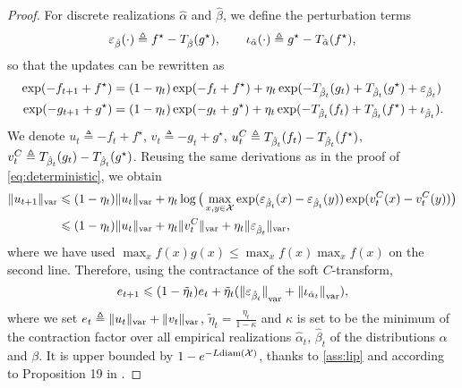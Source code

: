 \begin{proof}
For discrete realizations $\hat \alpha$ and $\hat \beta$, we define the perturbation terms
\begin{equation}
    \epsilon_{\hat \beta}(\cdot) \triangleq
    f^\star - \Ctrans{g^\star}{\hat \beta} ,\qquad
    \iota_{\hat \alpha}(\cdot) \triangleq 
    g^\star - \Ctrans{f^\star}{\hat \alpha},
\end{equation}
so that the updates can be rewritten as
\begin{align}
    \exp(-f_{t+1} + f^\star) &= (1 - \eta_t)
    \exp(-f_{t} + f^\star)
    + \eta_t \exp(-\Ctrans{g_t}{\hat \beta_t} 
    +\Ctrans{g^\star}{\hat \beta_t} + \epsilon_{\hat \beta_t}) \\
    \exp(-g_{t+1} + g^\star) &= (1 - \eta_t)
    \exp(-g_{t} + g^\star)
    + \eta_t \exp(-\Ctrans{f_t}{\hat \beta_t} 
    +\Ctrans{f^\star}{\hat \beta_t} + \iota_{\hat \beta_t}).
\end{align}
We denote $u_t \triangleq -f_{t} + f^\star$, $v_t \triangleq -g_{t} + g^\star$, $u_t^C \triangleq
\Ctrans{f_t}{\hat \beta_t} - \Ctrans{f^\star}{\hat \beta_t}$, $v_t^C \triangleq
\Ctrans{g_t}{\hat \beta_t} - \Ctrans{g^\star}{\hat \beta_t}$. Reusing the same
derivations as in the proof of \autoref{eq:deterministic}, we obtain
    \label{eq:pre_ineq_var}
    \begin{align}
    \Vert u_{t+1} \Vert_{\var} &\leq
    (1 - \eta_t) \Vert u_t \Vert_{\var}
    + \eta_t \log \big( \max_{x, y \in \Xx}
    \exp(\epsilon_{\hat \beta_t}(x) 
    - \epsilon_{\hat \beta_t}(y)) \exp(v_t^C(x) - v_t^C(y)) \big) \\ 
    &\leq
    (1 - \eta_t) \Vert u_t \Vert_{\var}
    + \eta_t \Vert v_t^C \Vert_{\var}
    + \eta_t \Vert \epsilon_{\hat \beta_t} \Vert_{\var},
\end{align}
where we have used $\max_x f(x) g(x) \leq \max_x f(x) \max_x f(x)$ on the second line. Therefore,
using the contractance of the soft $C$-transform,
\begin{equation}
    \label{eq:ineq_var}
    e_{t+1} \leq 
    (1 - \tilde \eta_t) e_t
    + \tilde \eta_t
    ({\Vert \epsilon_{\hat \beta_t} \Vert}_{\var} + 
    {\Vert \iota_{\hat \alpha_t} \Vert}_{\var}),
\end{equation}
where we set $e_t \triangleq \Vert u_t \Vert_{\var} + \Vert v_t \Vert_{\var}$,
$\tilde \eta_t = \frac{\eta_t}{1-\kappa}$ and $\kappa$ is set to be the minimum
of the contraction factor over all empirical realizations $\hat \alpha_t$, $\hat
\beta_t$ of the distributions $\alpha$ and $\beta$. It is upper bounded by
$1 - e^{- L\text{diam}(\Xx)}$, thanks to \autoref{ass:lip} and according to Proposition 19 in \citet{vialard2019elementary}.


\end{proof}
